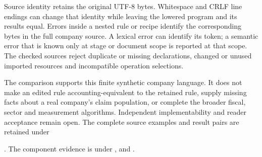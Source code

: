 Source identity retains the original UTF-8 bytes. Whitespace and CRLF line
endings can change that identity while leaving the lowered program and its
results equal. Errors inside a nested rule or recipe identify the corresponding
bytes in the full company source. A lexical error can identify its token; a
semantic error that is known only at stage or document scope is reported at
that scope. The checked sources reject duplicate or missing declarations,
changed or unused imported resources and incompatible operation selections.

The comparison supports this finite synthetic company language. It does not
make an edited rule accounting-equivalent to the retained rule, supply missing
facts about a real company's claim population, or complete the broader fiscal,
sector and measurement algorithms. Independent implementability and reader
acceptance remain open. The complete source examples and result pairs are
retained under
\begingroup\raggedright
{}.
The component evidence is under
,
and .
\par\endgroup
